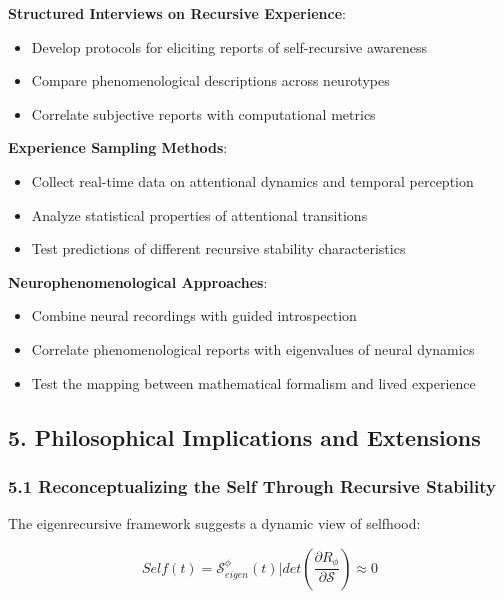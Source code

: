 \documentclass[
]{article}
\providecommand{\tightlist}{%
  \setlength{\itemsep}{0pt}\setlength{\parskip}{0pt}}
\begin{document}
\textbf{Structured Interviews on Recursive Experience}:

\begin{itemize}
\tightlist
\item
  Develop protocols for eliciting reports of self-recursive awareness
\item
  Compare phenomenological descriptions across neurotypes
\item
  Correlate subjective reports with computational metrics
\end{itemize}

\textbf{Experience Sampling Methods}:

\begin{itemize}
\tightlist
\item
  Collect real-time data on attentional dynamics and temporal perception
\item
  Analyze statistical properties of attentional transitions
\item
  Test predictions of different recursive stability characteristics
\end{itemize}

\textbf{Neurophenomenological Approaches}:

\begin{itemize}
\tightlist
\item
  Combine neural recordings with guided introspection
\item
  Correlate phenomenological reports with eigenvalues of neural dynamics
\item
  Test the mapping between mathematical formalism and lived experience
\end{itemize}

\subsection{5. Philosophical Implications and
Extensions}\label{philosophical-implications-and-extensions}

\subsubsection{5.1 Reconceptualizing the Self Through Recursive
Stability}\label{reconceptualizing-the-self-through-recursive-stability}

The eigenrecursive framework suggests a dynamic view of selfhood:

\[Self(t) = \mathcal{S}_{eigen}^{\phi}(t) | det\left(\frac{\partial R_{\phi}}{\partial \mathcal{S}}\right) \approx 0\]
\end{document}
